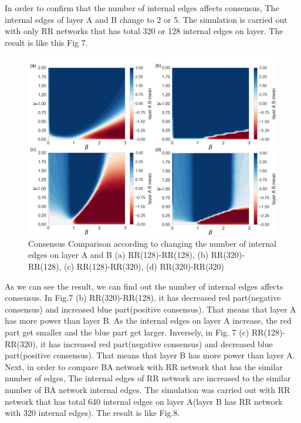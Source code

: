 \documentclass[english]{cccconf}
\begin{document}
In order to confirm that the number of internal edges affects consensus, The internal edges of layer A and B change to 2 or 5. The simulation is carried out with only RR networks that has total 320 or 128 internal edges on layer. The result is like this Fig 7.
\begin{figure}[!htb]
  \centering
  \includegraphics[width=\hsize]{FIG7.png}
  \caption{Consensus Comparison according to changing the number of internal edges on layer A and B (a) RR(128)-RR(128), (b) RR(320)-RR(128), (c) RR(128)-RR(320), (d) RR(320)-RR(320)}
  \label{Fig7}
\end{figure}
As we can see the result, we can find out the number of internal edges affects consensus. In Fig.7 (b) RR(320)-RR(128), it has decreased red part(negative consensus) and increased blue part(positive consensus). That means that layer A has more power than layer B. As the internal edges on layer A increase, the red part get smaller and the blue part get larger.
Inversely, in Fig. 7 (c) RR(128)-RR(320), it has increased red part(negative consensus) and decreased blue part(positive consensus). That means that layer B has more power than layer A. 
Next, in order to compare BA network with RR network that has the similar number of edges, The internal edges of RR network are increased to the similar number of BA network internal edges. The simulation was carried out with RR network that has total 640 internal edges on layer A(layer B has RR network with 320 internal edges). The result is like Fig.8. 
\end{document}
